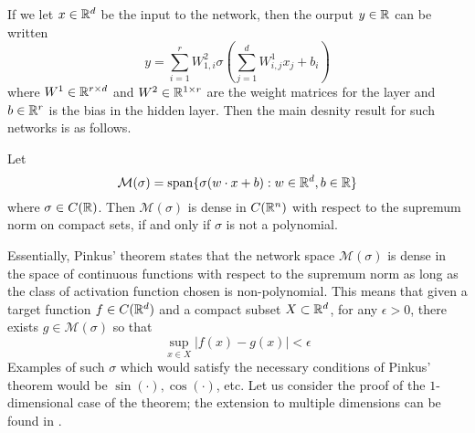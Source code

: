 If we let $x \in \mathbb{R}^d$ be the input to the network, then the ourput $y \in \mathbb{R}$ can be written
\begin{displaymath}
  y = \sum_{i=1}^r W_{1, i}^2 \sigma\left( \displaystyle\sum_{j=1}^{d}W_{i, j}^1 x_j + b_i\right)
\end{displaymath}
where $W^1 \in \mathbb{R}^{r \times d}$ and $W^2 \in \mathbb{R}^{1 \times r}$ are the weight matrices for the layer and $b \in \mathbb{R}^r$ is the bias in the hidden layer. Then the main desnity result for such networks is as follows. 
\begin{theorem}[Pinkus]
  Let
  \begin{displaymath}
    \mathcal{M}(\sigma) = \operatorname{span}\{ \sigma(w\cdot x + b): w \in \mathbb{R}^d, b \in \mathbb{R}\}
  \end{displaymath}
  where $\sigma \in C(\mathbb{R})$. Then $\mathcal{M}(\sigma)$ is dense in $C(\mathbb{R}^n)$ with respect to the supremum norm on compact sets, if and only if $\sigma$ is not a polynomial.
\end{theorem}
Essentially, Pinkus' theorem states that the network space $\mathcal{M}(\sigma)$ is dense in the space of continuous functions with respect to the supremum norm as long as the class of activation function chosen is non-polynomial. This means that given a target function $f \in C(\mathbb{R}^d)$ and a compact subset $X \subset \mathbb{R}^d$, for any $\epsilon > 0$, there exists $g \in \mathcal{M}(\sigma)$ so that 
\[ \sup_{x \in X} | f(x) - g(x) | < \epsilon \]
Examples of such $\sigma$ which would satisfy the necessary conditions of Pinkus' theorem would be $\sin(\cdot), \cos(\cdot)$, etc. Let us consider the proof of the $1$-dimensional case of the theorem; the extension to multiple dimensions can be found in \cite{surv}.

